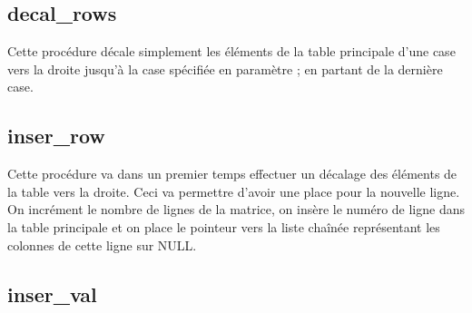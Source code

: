 \subsection{decal\_rows}
  Cette procédure décale simplement les éléments de la table principale d'une case vers la droite jusqu'à la case spécifiée en paramètre ; en partant de la dernière case.

\subsection{inser\_row}
  Cette procédure va dans un premier temps effectuer un décalage des éléments de la table vers la droite. Ceci va permettre d'avoir une place pour la nouvelle ligne.
  On incrément le nombre de lignes de la matrice, on insère le numéro de ligne dans la table principale et on place le pointeur vers la liste chaînée représentant les colonnes de cette ligne sur NULL.

\subsection{inser\_val}
  \begin{algo}[informal] %
    \BEGIN
      
      \RETURN{}
    \END
  \end{algo}
  
  \begin{algo}[informal] %
    \VAR
      \DECLVAR{}{}
    \ENDVAR
  \end{algo}
